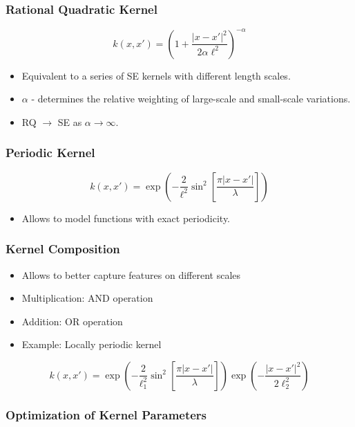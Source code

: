 \begin{frame} \frametitle{Rational Quadratic Kernel}
\begin{equation}
  k(x,x') = \left( 1 + \frac{\left|x-x'\right|^2}{2\alpha\ell^2} \right)^{-\alpha}
\end{equation}
\begin{itemize}
  \item Equivalent to a series of SE kernels with different length scales.
  \item $\alpha$ - determines the relative weighting of large-scale and
    small-scale variations.
  \item RQ $\rightarrow$ SE as $\alpha\rightarrow\infty$.
\end{itemize}
\begin{center}
\end{center}
\end{frame}

\begin{frame} \frametitle{Periodic Kernel}
\begin{equation}
  k(x,x') = \exp\left(-\frac{2}{\ell^2}\sin^2\left[\frac{\pi|x - x'|}{\lambda}\right]\right)
\end{equation}
\begin{itemize}
  \item Allows to model functions with exact periodicity.
\end{itemize}
\end{frame}

\begin{frame} \frametitle{Kernel Composition}
\begin{itemize}
  \item Allows to better capture features on different scales
  \item Multiplication: AND operation
  \item Addition: OR operation
  \item Example: Locally periodic kernel
\end{itemize}
\begin{equation}
  k(x,x') =
  \exp\left(-\frac{2}{\ell_1^2}\sin^2\left[\frac{\pi|x - x'|}{\lambda}\right]\right)
  \exp\left(-\frac{\left|x-x'\right|^2}{2\ell_2^2}\right)
\end{equation}
\end{frame}

\begin{frame} \frametitle{Optimization of Kernel Parameters}
\end{frame}

